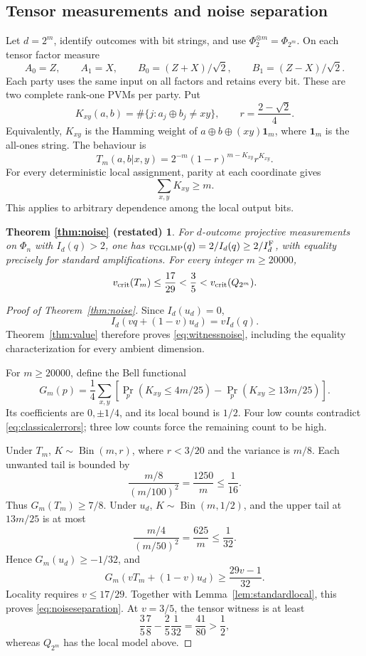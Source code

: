 \documentclass[11pt]{amsart}
\theoremstyle{remark}
\theoremstyle{plain}
\newtheorem*{noiseagain}{Theorem \ref{thm:noise} (restated)}
\numberwithin{equation}{section}
\DeclareMathOperator{\Bin}{Bin}
\newcommand{\ind}{\mathbf 1}
\newcommand{\IF}{I_d^{\rm F}}
\begin{document}
\subsection{Tensor measurements and noise separation}

Let \(d=2^m\), identify outcomes with bit strings, and use
\(\Phi_2^{\otimes m}=\Phi_{2^m}\).
On each tensor factor measure
\[
 A_0=Z,\qquad A_1=X,\qquad
 B_0=(Z+X)/\sqrt2,\qquad B_1=(Z-X)/\sqrt2.
\]
Each party uses the same input on all factors and retains every bit.
These are two complete rank-one PVMs per party. Put
\[
 K_{xy}(a,b)=\#\{j:a_j\oplus b_j\ne xy\},\qquad
 r=\frac{2-\sqrt2}{4}.
\]
Equivalently, \(K_{xy}\) is the Hamming weight of
\(a\oplus b\oplus(xy)\ind_m\), where \(\ind_m\) is the all-ones string.
The behaviour is
\begin{equation}\label{eq:tensorbehaviour}
 T_m(a,b|x,y)=2^{-m}(1-r)^{m-K_{xy}}r^{K_{xy}}.
\end{equation}
For every deterministic local assignment, parity at each coordinate
gives
\begin{equation}\label{eq:classicalerrors}
 \sum_{x,y}K_{xy}\ge m.
\end{equation}
This applies to arbitrary dependence among the local output bits.

\begin{noiseagain}
For \(d\)-outcome projective measurements on \(\Phi_n\) with
\(I_d(q)>2\), one has
\(v_{\rm CGLMP}(q)=2/I_d(q)\ge2/\IF\), with equality precisely for
standard amplifications.
For every integer \(m\ge20000\),
\[
 v_{\rm crit}(T_m)\le\frac{17}{29}
 <\frac35<v_{\rm crit}(Q_{2^m}).
\]
\end{noiseagain}

\begin{proof}[Proof of Theorem~\ref{thm:noise}]
Since \(I_d(u_d)=0\),
\[
 I_d(vq+(1-v)u_d)=vI_d(q).
\]
Theorem~\ref{thm:value} therefore proves \eqref{eq:witnessnoise},
including the equality characterization for every ambient dimension.

For \(m\ge20000\), define the Bell functional
\[
 G_m(p)=\frac14\sum_{x,y}
 \left[\Pr_p(K_{xy}\le4m/25)-\Pr_p(K_{xy}\ge13m/25)\right].
\]
Its coefficients are \(0,\pm1/4\), and its local bound is \(1/2\).
Four low counts contradict \eqref{eq:classicalerrors}; three low counts
force the remaining count to be high.

Under \(T_m\), \(K\sim\Bin(m,r)\), where \(r<3/20\) and the variance
is \(m/8\). Each unwanted tail is bounded by
\[
 \frac{m/8}{(m/100)^2}=\frac{1250}{m}\le\frac1{16}.
\]
Thus \(G_m(T_m)\ge7/8\).
Under \(u_d\), \(K\sim\Bin(m,1/2)\), and the upper tail at \(13m/25\)
is at most
\[
 \frac{m/4}{(m/50)^2}=\frac{625}{m}\le\frac1{32}.
\]
Hence \(G_m(u_d)\ge-1/32\), and
\[
 G_m(vT_m+(1-v)u_d)\ge\frac{29v-1}{32}.
\]
Locality requires \(v\le17/29\).
Together with Lemma~\ref{lem:standardlocal}, this proves
\eqref{eq:noiseseparation}.
At \(v=3/5\), the tensor witness is at least
\[
 \frac35\frac78-\frac25\frac1{32}
 =\frac{41}{80}>\frac12,
\]
whereas \(Q_{2^m}\) has the local model above.
\end{proof}
\end{document}
